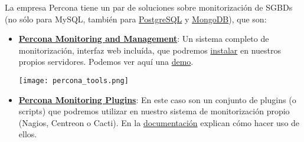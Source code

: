 La empresa Percona tiene un par de soluciones sobre monitorización de SGBDs (no sólo para MySQL, también para \href{https://www.postgresql.org/}{PostgreSQL} y \href{https://www.mongodb.com/}{MongoDB}), que son:
\begin{itemize}
    \item \href{https://www.percona.com/software/database-tools/percona-monitoring-and-management}{\textbf{Percona Monitoring and Management}}: Un sistema completo de monitorización, interfaz web incluída, que podremos \href{https://www.percona.com/software/pmm/quickstart}{instalar} en nuestros propios servidores. Podemos ver aquí una \href{https://pmmdemo.percona.com/graph/}{demo}.

    \texttt{[image: percona\_tools.png]}

    \item \href{https://www.percona.com/software/database-tools/percona-monitoring-plugins}{\textbf{Percona Monitoring Plugins}}: En este caso son un conjunto de plugins (o scripts) que podremos utilizar en nuestro sistema de monitorización propio (Nagios, Centreon o Cacti). En la \href{https://www.percona.com/doc/percona-monitoring-plugins/LATEST/index.html}{documentación} explican cómo hacer uso de ellos.
\end{itemize}

\fi

\clearpage